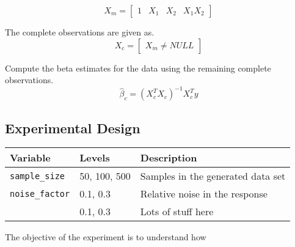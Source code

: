 \documentclass[../paper.tex]{subfiles}
\begin{document}
\begin{equation}
  X_{m} = \begin{bmatrix} \label{eq:lol}
  1 & X_{1} & X_{2} & X_{1}X_{2}
\end{bmatrix}
\end{equation}

The complete observations are given as.
\begin{equation}
  X_{c} =
  \begin{bmatrix} \label{eq:lol}
    X_{m} \neq NULL
  \end{bmatrix}
\end{equation}

Compute the beta estimates for the data using the remaining complete observations.
\begin{equation}
  \hat{\beta}_{c} = (X_{c}^{T}X_{c})^{-1} X_{c}^{T} y
\end{equation}




\subsection{Experimental Design}

\begin{center}
    \begin{tabular}{ | l | p{1.5in} | p{3in} | }
      \hline
      Variable & Levels & Description \\ \hline
      \texttt{sample_size} & 50, 100, 500 &  Samples in the generated data set \\ \hline
      \texttt{noise_factor} & 0.1, 0.3 &  Relative noise in the response \\ \hline
      \texttt{} & 0.1, 0.3 &  Lots of stuff here \\ \hline
    \end{tabular}
\end{center}

 The objective of the experiment is to understand how
\end{document}
